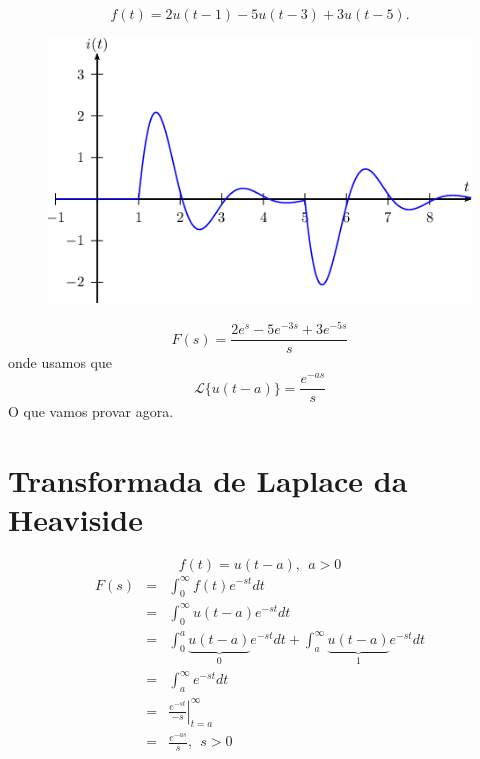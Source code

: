 \documentclass[a4paper,10pt]{book}
\begin{document}
 \begin{equation}
 f(t)=2u(t-1)-5u(t-3)+3u(t-5).
 \end{equation}
 \begin{figure}[!ht]
\begin{center}

\includegraphics{figs/figura_8}\end{center}
\caption{\label{fig_Heaviside_4}}
\end{figure} 
 $$F(s)=\frac{2e^{s}-5e^{-3s}+3e^{-5s}}{s}$$
onde usamos que
$$\mathcal{L}\{u(t-a)\}=\frac{e^{-as}}{s}$$
O que vamos provar agora.  
 \section{Transformada de Laplace da Heaviside}
% 
 $$f(t)=u(t-a), ~~a>0$$
% 
 \begin{eqnarray*}
  F(s)&=&\int_0^\infty f(t)e^{-st}dt\\
  &=&\int_0^\infty u(t-a)e^{-st}dt\\
&=&\int_0^a \underbrace{u(t-a)}_{0}e^{-st}dt + \int_a^\infty \underbrace{u(t-a)}_{1}e^{-st}dt\\
&=& \int_a^\infty e^{-st}dt\\
&=&\left.\frac{e^{-st}}{-s}\right|_{t=a}^\infty\\
&=&\frac{e^{-as}}{s},~~s>0
\end{eqnarray*}
% 
\end{document}
